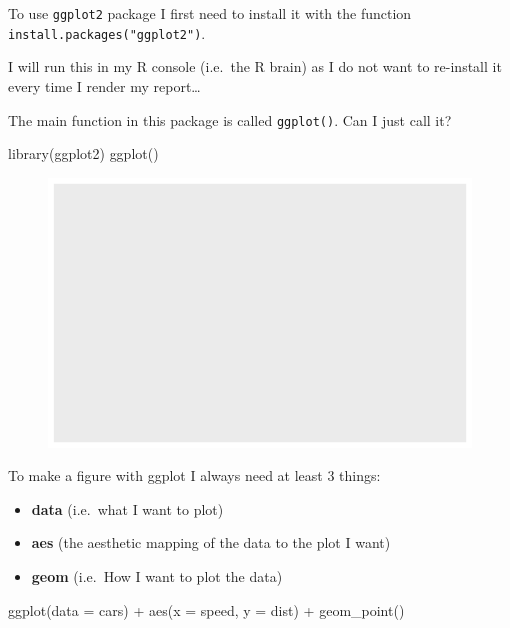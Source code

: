 \documentclass[
  letterpaper,
  DIV=11,
  numbers=noendperiod]{scrartcl}
\newenvironment{Shaded}{\begin{snugshade}}{\end{snugshade}}
\newcommand{\AttributeTok}[1]{\textcolor[rgb]{0.40,0.45,0.13}{#1}}
\newcommand{\FunctionTok}[1]{\textcolor[rgb]{0.28,0.35,0.67}{#1}}
\newcommand{\NormalTok}[1]{\textcolor[rgb]{0.00,0.23,0.31}{#1}}
\newcommand{\SpecialCharTok}[1]{\textcolor[rgb]{0.37,0.37,0.37}{#1}}
\providecommand{\tightlist}{%
  \setlength{\itemsep}{0pt}\setlength{\parskip}{0pt}}\usepackage{longtable,booktabs,array}
\begin{document}
To use \texttt{ggplot2} package I first need to install it with the
function \texttt{install.packages("ggplot2")}.

I will run this in my R console (i.e.~the R brain) as I do not want to
re-install it every time I render my report\ldots{}

The main function in this package is called \texttt{ggplot()}. Can I
just call it?

\begin{Shaded}
\begin{Highlighting}[]
\FunctionTok{library}\NormalTok{(ggplot2)}
\FunctionTok{ggplot}\NormalTok{()}
\end{Highlighting}
\end{Shaded}

\begin{figure}[H]

{\centering \includegraphics{class05_files/figure-pdf/unnamed-chunk-3-1.pdf}

}

\end{figure}

To make a figure with ggplot I always need at least 3 things:

\begin{itemize}
\tightlist
\item
  \textbf{data} (i.e.~what I want to plot)
\item
  \textbf{aes} (the aesthetic mapping of the data to the plot I want)
\item
  \textbf{geom} (i.e.~How I want to plot the data)
\end{itemize}

\begin{Shaded}
\begin{Highlighting}[]
\FunctionTok{ggplot}\NormalTok{(}\AttributeTok{data =}\NormalTok{ cars) }\SpecialCharTok{+}
  \FunctionTok{aes}\NormalTok{(}\AttributeTok{x =}\NormalTok{ speed, }\AttributeTok{y =}\NormalTok{ dist) }\SpecialCharTok{+}
  \FunctionTok{geom\_point}\NormalTok{()}
\end{Highlighting}
\end{Shaded}
\end{document}

